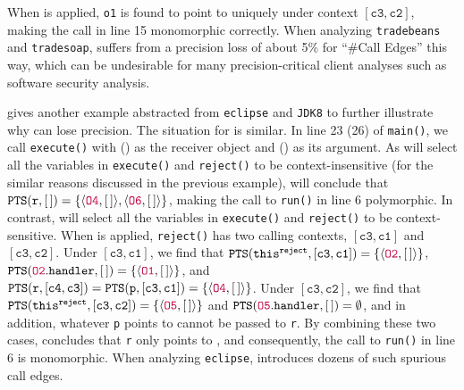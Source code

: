 When  is applied,
 \texttt{o1} is found to
point to   uniquely
 under context $[\mathtt{c3}, \mathtt{c2}]$, making the call in line 15  monomorphic
 correctly. When analyzing \texttt{tradebeans} and \texttt{tradesoap}, 
  suffers from a precision loss of about 5\% for ``\#Call Edges'' this way, which can be undesirable
 for many precision-critical client analyses such as software security analysis.

 gives another example abstracted from \texttt{eclipse} and \texttt{JDK8} to further illustrate why  can lose precision. The
situation for  is similar.
In  line 23 (26) of \texttt{main()}, we call \texttt{execute()} with  () as the receiver object and  () as its argument. As \selectx will
select
all the variables in \texttt{execute()} and \texttt{reject()}  to be context-insensitive (for the similar reasons discussed in the previous example), 
 will conclude that 
$\texttt{PTS}(\texttt{r}, [\,]) = \{\langle {\color{purple}\texttt{O4}}, [\,]\rangle, \langle{\color{purple}\texttt{O6}}, [\,]\rangle\}$, 
making the call
to \texttt{run()} in line 6 polymorphic. In contrast, \tool will select
all the variables in \texttt{execute()} and \texttt{reject()} to be context-sensitive.  When  is applied,
\texttt{reject()} has two calling contexts,  $[\mathtt{c3}, \mathtt{c1}]$ and $[\mathtt{c3}, \mathtt{c2}]$. Under  $[\mathtt{c3}, \mathtt{c1}]$, we find that 
$\texttt{PTS}(\texttt{this}^\texttt{reject}, [\mathtt{c3}, \mathtt{c1}]) = \{\langle {\color{purple}\texttt{O2}}, [\,] \rangle\}$, 
$\texttt{PTS}({\color{purple}\texttt{O2}}.\texttt{handler}, [\,]) = \{\langle {\color{purple}\texttt{O1}}, [\,] \rangle\}$, 
and $\texttt{PTS}(\texttt{r}, [\mathtt{c4}, \mathtt{c3}]) = \texttt{PTS}(\texttt{p}, [\mathtt{c3}, \mathtt{c1}]) = \{\langle {\color{purple}\texttt{O4}}, [\,] \rangle\}$. 
Under  $[\mathtt{c3}, \mathtt{c2}]$, we find
that $\texttt{PTS}(\texttt{this}^\texttt{reject}, [\mathtt{c3}, \mathtt{c2}]) = \{\langle {\color{purple}\texttt{O5}}, [\,] \rangle\}$ and $\texttt{PTS}({\color{purple}\texttt{O5}}.\texttt{handler}, [\,]) = \emptyset$, and in addition, whatever \texttt{p}
points to cannot be passed to  \texttt{r}. By combining these two cases, 
 concludes that \texttt{r} only points to ,
and consequently, the call to \texttt{run()} in line 6
is  monomorphic. When analyzing \texttt{eclipse}, 
introduces dozens of such spurious call edges.

